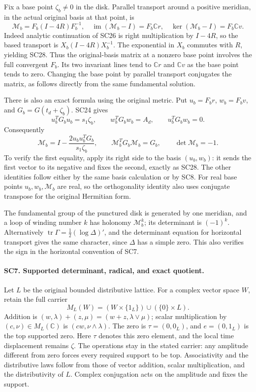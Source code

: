 \documentclass[11pt,a4paper]{article}
\theoremstyle{definition}\newtheorem{definition}[theorem]{Definition}
\begin{document}
Fix a base point \(\zeta_b\ne0\) in the disk. Parallel transport
around a positive meridian, in the actual original basis at
that point, is
\[
 \mathcal M_b
 =F_b(I-4R)F_b^{-1},\quad
 \operatorname{im}(\mathcal M_b-I)=F_b\mathbb Cr,\quad
 \ker(\mathcal M_b-I)=F_b\mathbb Cv.
 \tag{SC28}
\]
Indeed analytic continuation of SC26 is right multiplication by
\(I-4R\), so the based transport is \(X_b(I-4R)X_b^{-1}\).
The exponential in \(X_b\) commutes with \(R\), yielding SC28.
Thus the original-basis matrix at a nonzero base point involves
the full convergent \(F_b\). Its two invariant lines tend to
\(\mathbb Cr\) and \(\mathbb Cv\) as the base point tends to zero.
Changing the base point by parallel transport conjugates the
matrix, as follows directly from the same fundamental solution.

There is also an exact formula using the original metric.
Put \(u_b=F_br\), \(w_b=F_bv\), and \(G_b=G(t_d+\zeta_b)\).
SC24 gives
\[
 u_b^TG_bu_b=s_1\zeta_b,\qquad
 w_b^TG_bw_b=A_d,\qquad u_b^TG_bw_b=0.
\]
Consequently
\[
 \mathcal M_b
   =I-\frac{2u_bu_b^TG_b}{s_1\zeta_b},\qquad
 \mathcal M_b^TG_b\mathcal M_b=G_b,\qquad
 \det\mathcal M_b=-1 .
 \tag{SC29}
\]
To verify the first equality, apply its right side to the
basis \((u_b,w_b)\): it sends the first vector to its negative
and fixes the second, exactly as SC28. The other identities
follow either by the same basis calculation or by SC8.
For real base points \(u_b,w_b,\mathcal M_b\) are real, so the
orthogonality identity also uses conjugate transpose for the
original Hermitian form.

The fundamental group of the punctured disk is generated by
one meridian, and a loop of winding number \(k\) has holonomy
\(\mathcal M_b^k\); its determinant is \((-1)^k\).
Alternatively \(\operatorname{tr}\Gamma=
\frac12(\log\Delta)'\), and the determinant equation for
horizontal transport gives the same character, since \(\Delta\)
has a simple zero. This also verifies the sign in the
horizontal convention of SC7.

\paragraph{SC7. Supported determinant, radical, and exact quotient.}
Let \(L\) be the original bounded distributive lattice. For a
complex vector space \(W\), retain the full carrier
\[
 M_L(W)=(W\times\{1_L\})\cup(\{0\}\times L).
 \tag{SC30}
\]
Addition is \((w,\lambda)+(z,\mu)=(w+z,\lambda\vee\mu)\);
scalar multiplication by \((c,\nu)\in M_L(\mathbb C)\) is
\((cw,\nu\wedge\lambda)\). The zero is
\(\tau=(0,0_L)\), and \(e=(0,1_L)\) is the top supported
zero. Here \(\tau\) denotes this zero element, and the local
time displacement remains \(\zeta\).
The operations stay in the stated carrier: any amplitude
different from zero forces every required support to be top.
Associativity and the distributive laws follow from those of
vector addition, scalar multiplication, and the distributivity
of \(L\). Complex conjugation acts on the amplitude and fixes
the support.
\end{document}
